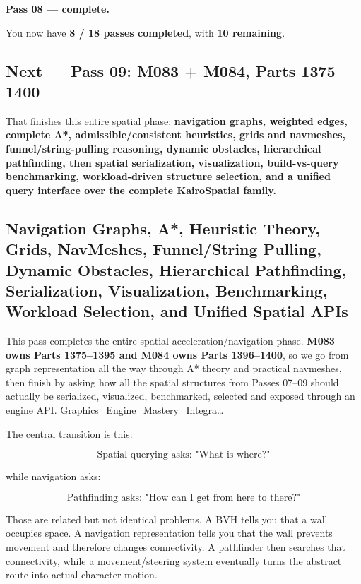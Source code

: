 \textbf{Pass 08 --- complete.}

You now have \textbf{8 / 18 passes completed}, with \textbf{10 remaining}.

\subsection{Next --- Pass 09: M083 + M084, Parts 1375--1400}\label{06-engine-ii-ch030-next-pass-09-m083-m084-parts-13751400}

That finishes this entire spatial phase: \textbf{navigation graphs, weighted edges, complete A*, admissible/consistent heuristics, grids and navmeshes, funnel/string-pulling reasoning, dynamic obstacles, hierarchical pathfinding, then spatial serialization, visualization, build-vs-query benchmarking, workload-driven structure selection, and a unified query interface over the complete KairoSpatial family.}

\subsection{Navigation Graphs, A*, Heuristic Theory, Grids, NavMeshes, Funnel/String Pulling, Dynamic Obstacles, Hierarchical Pathfinding, Serialization, Visualization, Benchmarking, Workload Selection, and Unified Spatial APIs}\label{06-engine-ii-ch030-navigation-graphs-a-heuristic-theory-grids-navmeshes-funnelstring-pulling-dynamic-obstacles-hierarchical-pathfinding-serialization-visualization-benchmarking-workload-selection-and-unified-spatial-apis}

This pass completes the entire spatial-acceleration/navigation phase. \textbf{M083 owns Parts 1375--1395 and M084 owns Parts 1396--1400}, so we go from graph representation all the way through A* theory and practical navmeshes, then finish by asking how all the spatial structures from Passes 07--09 should actually be serialized, visualized, benchmarked, selected and exposed through an engine API. Graphics\_Engine\_Mastery\_Integra\ldots{}

The central transition is this:

\[
\text{Spatial querying asks: "What is where?"}
\]

while navigation asks:

\[
\text{Pathfinding asks: "How can I get from here to there?"}
\]

Those are related but not identical problems. A BVH tells you that a wall occupies space. A navigation representation tells you that the wall prevents movement and therefore changes connectivity. A pathfinder then searches that connectivity, while a movement/steering system eventually turns the abstract route into actual character motion.


